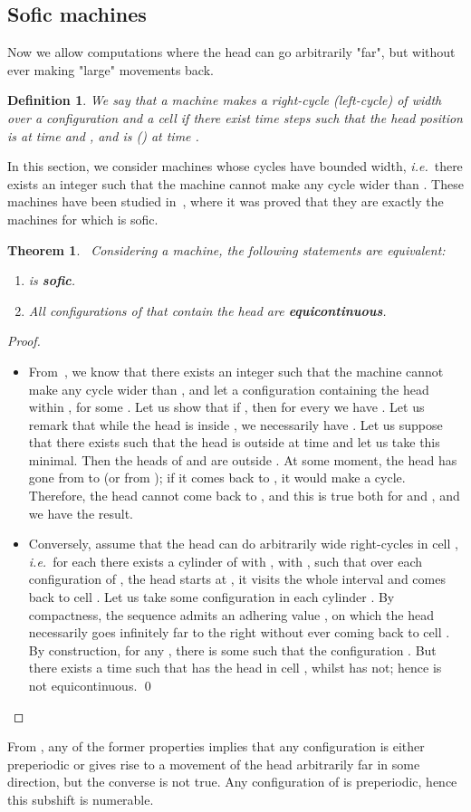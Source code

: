 \documentclass{llncs}
\newtheorem{teo}{Theorem}
\newtheorem{defi}{Definition}
\newcommand{\xpr}[1]{"#1"}
\newcommand{\ie}{\textit{i.e.}\ }
\begin{document}
\subsection{Sofic machines}
Now we allow computations where the head can go arbitrarily \xpr{far}, but without ever making \xpr{large} movements back.
\begin{defi}
 We say that a machine makes a \emph{right-cycle} (\emph{left-cycle}) of width  over a configuration  and a cell  if there exist time steps  such that the head position is  at time  and , and is  () at time .
\end{defi}
In this section, we consider machines whose cycles have bounded width, \ie there exists an integer  such that the machine cannot make any cycle wider than .
These machines have been studied in~\cite{GajaJAC,Gaja07}, where it was proved that they are exactly the machines for which  is sofic.
\begin{teo}~\label{t:sofic}
Considering a machine, the following statements are equivalent:
\begin{enumerate}
 \item\label{sofic}  is {\bf sofic}.
 \item\label{i:tmheq} All configurations of  that contain the head are {\bf equicontinuous}.
\end{enumerate}
\end{teo}
\begin{proof}~\begin{itemize}
 \item[\ref{sofic}\ref{i:tmheq}]
 From~\cite{Gaja07}, we know that there exists an integer  such that the machine cannot make any cycle wider than , and let  a configuration containing the head within , for some .
 Let us show that if , then for every  we have .
 Let us remark that while the head is inside , we necessarily have .
 Let us suppose that there exists  such that the head is outside  at time  and let us take this  minimal.
 Then the heads of  and  are outside .
 At some moment, the head has gone from  to  (or from ); if it comes back to , it would make a cycle.
 Therefore, the head cannot come back to , and this is true both for  and , and we have the result.
\item[\ref{i:tmheq}\ref{sofic}]
  Conversely, assume that the head can do arbitrarily wide right-cycles in cell , \ie for each  there exists a cylinder  of  with , with , such that over each configuration of , the head starts at , it visits the whole interval  and comes back to cell .
 Let us take some configuration  in each cylinder .
 By compactness, the sequence  admits an adhering value , on which the head necessarily goes infinitely far to the right without ever coming back to cell .
 By construction, for any , there is some  such that the configuration .
 But there exists a time  such that  has the head in cell , whilst  has not; hence  is not equicontinuous.
 \qed
\end{itemize}
\end{proof}
From \cite{GajaJAC}, any of the former properties implies that any configuration is either preperiodic or gives rise to a movement of the head arbitrarily far in some direction, but the converse is not true.
Any configuration of  is preperiodic, hence this subshift is numerable.
\end{document}
